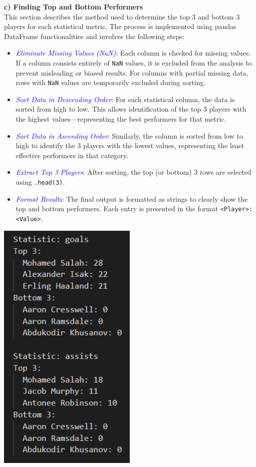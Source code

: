 \documentclass[a4paper,12pt]{article}
\begin{document}
\textbf{c) Finding Top and Bottom Performers} \\
This section describes the method used to determine the top 3 and bottom 3 players for each statistical metric. The process is implemented using pandas DataFrame functionalities and involves the following steps:
\begin{itemize}
    \item \textit{\textcolor{blue}{Eliminate Missing Values (NaN)}}: Each column is checked for missing values. If a column consists entirely of \texttt{NaN} values, it is excluded from the analysis to prevent misleading or biased results. For columns with partial missing data, rows with \texttt{NaN} values are temporarily excluded during sorting.
    \item \textit{\textcolor{blue}{Sort Data in Descending Order}}: For each statistical column, the data is sorted from high to low. This allows identification of the top 3 players with the highest values—representing the best performers for that metric.
    \item \textit{\textcolor{blue}{Sort Data in Ascending Order}}: Similarly, the column is sorted from low to high to identify the 3 players with the lowest values, representing the least effective performers in that category.
    \item \textit{\textcolor{blue}{Extract Top 3 Players}}: After sorting, the top (or bottom) 3 rows are selected using \texttt{.head(3)}.
    \item \textit{\textcolor{blue}{Format Results}}: The final output is formatted as strings to clearly show the top and bottom performers. Each entry is presented in the format \texttt{<Player>:<Value>}.
\end{itemize}

\begin{center}
    \includegraphics[width=0.5\textwidth]{top3.png}
\end{center}
\end{document}
